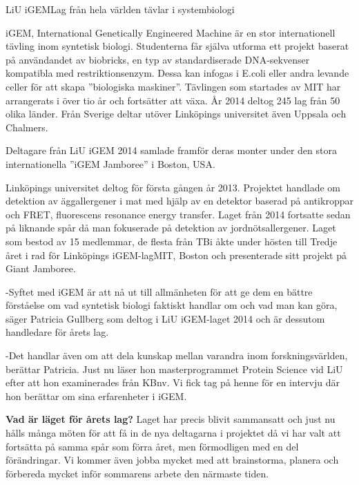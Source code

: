 \begin{news}{3}{LiU iGEM}{Lag från hela världen tävlar i systembiologi}{}{}{}

  iGEM, International Genetically Engineered Machine är en stor
  internationell tävling inom syntetisk biologi. Studenterna får
  själva utforma ett projekt baserat på användandet av biobricks, en
  typ av standardiserade DNA-sekvenser kompatibla med
  restriktionsenzym. Dessa kan infogas i E.coli eller andra levande
  celler för att skapa ”biologiska maskiner”. Tävlingen som startades
  av MIT har arrangerats i över tio år och fortsätter att växa. År
  2014 deltog 245 lag från 50 olika länder. Från Sverige deltar utöver
  Linköpings universitet även Uppsala och Chalmers.

     {Deltagare från LiU iGEM 2014 samlade
     framför deras monter under den stora internationella ”iGEM
     Jamboree” i Boston, USA.}

  Linköpings universitet deltog för första gången år 2013. Projektet
  handlade om detektion av äggallergener i mat med hjälp av en
  detektor baserad på antikroppar och FRET, fluorescens resonance
  energy transfer. Laget från 2014 fortsatte sedan på liknande spår då
  man fokuserade på detektion av jordnötsallergener. Laget som bestod
  av 15 medlemmar, de flesta från TBi åkte under hösten till Tredje
  året i rad för Linköpings iGEM-lagMIT, Boston och presenterade sitt
  projekt på Giant Jamboree.

  -Syftet med iGEM är att nå ut till allmänheten för att ge dem en
  bättre förståelse om vad syntetisk biologi faktiskt handlar om och
  vad man kan göra, säger Patricia Gullberg som deltog i LiU
  iGEM-laget 2014 och är dessutom handledare för årets lag.

  -Det handlar även om att dela kunskap mellan varandra inom
  forskningsvärlden, berättar Patricia. Just nu läser hon
  masterprogrammet Protein Science vid LiU efter att hon examinerades
  från KBnv. Vi fick tag på henne för en intervju där hon berättar om
  sina erfarenheter i iGEM.


  \textbf{Vad är läget för årets lag?}  Laget har precis blivit
  sammansatt och just nu hålls många möten för att få in de nya
  deltagarna i projektet då vi har valt att fortsätta på samma spår
  som förra året, men förmodligen med en del förändringar. Vi kommer
  även jobba mycket med att brainstorma, planera och förbereda mycket
  inför sommarens arbete den närmaste tiden.


\end{news}
